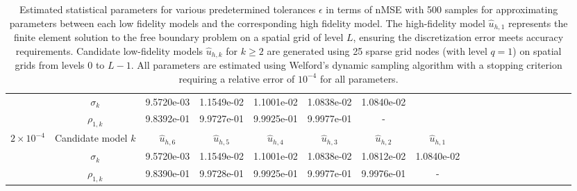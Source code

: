 \begin{table}[ht]
{\begin{tabular}{|c|c|c|c|c|c|c|c|c|c|c|c|c|c|c|c|c|c|c|}
 \cline{2-7}	
&\multicolumn{1}{|c|}{$\sigma_{k}$}&9.5720e-03   &1.1549e-02   &1.1001e-02   &1.0838e-02   &1.0840e-02  &\\
\cline{2-7}	
&\multicolumn{1}{|c|}{$\rho_{1,k}$}&9.8392e-01 &9.9727e-01 &9.9925e-01 &9.9977e-01 &- &\\
\hline
\hline
\multirow{3}{*}{$2\times 10^{-4}$} &\multicolumn{1}{|c|}{Candidate model $k$} &$\widehat u_{h,6}$&$\widehat u_{h,5}$&$\widehat u_{h,4}$&$\widehat u_{h,3}$&$\widehat u_{h,2}$&$\widehat u_{h,1}$\\
\cline{2-8}
&\multicolumn{1}{|c|}{$\sigma_{k}$}&9.5720e-03   &1.1549e-02   &1.1001e-02   &1.0838e-02   &1.0812e-02  &1.0840e-02\\
\cline{2-8}	
&\multicolumn{1}{|c|}{$\rho_{1,k}$}&9.8390e-01   &9.9728e-01   &9.9925e-01   &9.9977e-01   &9.9976e-01   &-\\
\hline
\end{tabular}}
\caption{Estimated statistical parameters for various predetermined tolerances $\epsilon$ in terms of nMSE with 500 samples for approximating parameters between each low fidelity models and the corresponding high fidelity model. The high-fidelity model $\widehat u_{h,1}$ represents the finite element solution to the free boundary problem on a spatial grid of level $L$, ensuring the discretization error meets accuracy requirements. Candidate low-fidelity models $\widehat u_{h,k}$ for $k \geq 2$ are generated using 25 sparse grid nodes (with level $q=1$) on spatial grids from levels 0 to $L-1$. All parameters are estimated using Welford's dynamic sampling algorithm with a stopping criterion requiring a relative error of $10^{-4}$ for all parameters.}
\label{Tab:MFMC_parameters}
\end{table}
%



